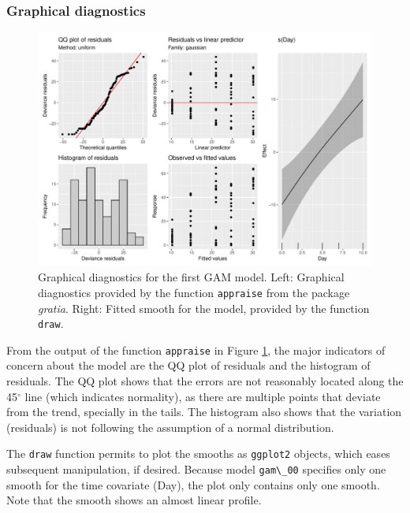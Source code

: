 \documentclass[
]{article}
\newcommand{\passthrough}[1]{#1}
\begin{document}
\hypertarget{graphical-diagnostics}{%
\subsubsection{Graphical diagnostics}\label{graphical-diagnostics}}

\begin{figure}

{\centering \includegraphics[width=0.75\linewidth]{Appendix_A_files/figure-latex/first-GAM-diag-1} 

}

\caption{Graphical diagnostics for the first GAM model. Left: Graphical diagnostics provided by the function \passthrough{\lstinline!appraise!} from the package \emph{gratia}. Right: Fitted smooth for the model, provided by the function \passthrough{\lstinline!draw!}.}\label{fig:first-GAM-diag}
\end{figure}



From the output of the function \passthrough{\lstinline!appraise!} in Figure \ref{fig:first-GAM-diag}, the major indicators of concern about the model are the QQ plot of residuals and the histogram of residuals. The QQ plot shows that the errors are not reasonably located along the 45\(^{\circ}\) line (which indicates normality), as there are multiple points that deviate from the trend, specially in the tails. The histogram also shows that the variation (residuals) is not following the assumption of a normal distribution.

The \passthrough{\lstinline!draw!} function permits to plot the smooths as \passthrough{\lstinline!ggplot2!} objects, which eases subsequent manipulation, if desired. Because model \passthrough{\lstinline!gam\_00!} specifies only one smooth for the time covariate (Day), the plot only contains only one smooth. Note that the smooth shows an almost linear profile.
\end{document}
